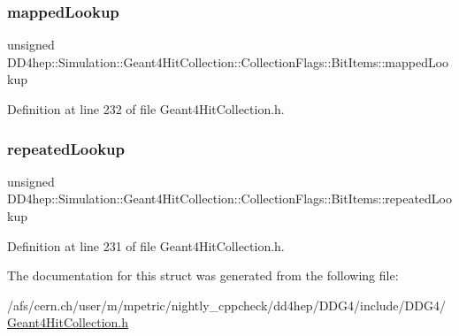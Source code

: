 \subsubsection{\texorpdfstring{mapped\+Lookup}{mappedLookup}}
{\footnotesize\ttfamily unsigned D\+D4hep\+::\+Simulation\+::\+Geant4\+Hit\+Collection\+::\+Collection\+Flags\+::\+Bit\+Items\+::mapped\+Lookup}



Definition at line 232 of file Geant4\+Hit\+Collection.\+h.

\hypertarget{struct_d_d4hep_1_1_simulation_1_1_geant4_hit_collection_1_1_collection_flags_1_1_bit_items_af334712a202c01ad71ea6578067ef3f7}{}\label{struct_d_d4hep_1_1_simulation_1_1_geant4_hit_collection_1_1_collection_flags_1_1_bit_items_af334712a202c01ad71ea6578067ef3f7} 
\subsubsection{\texorpdfstring{repeated\+Lookup}{repeatedLookup}}
{\footnotesize\ttfamily unsigned D\+D4hep\+::\+Simulation\+::\+Geant4\+Hit\+Collection\+::\+Collection\+Flags\+::\+Bit\+Items\+::repeated\+Lookup}



Definition at line 231 of file Geant4\+Hit\+Collection.\+h.



The documentation for this struct was generated from the following file\+:\begin{DoxyCompactItemize}
\item 
/afs/cern.\+ch/user/m/mpetric/nightly\+\_\+cppcheck/dd4hep/\+D\+D\+G4/include/\+D\+D\+G4/\hyperlink{_geant4_hit_collection_8h}{Geant4\+Hit\+Collection.\+h}\end{DoxyCompactItemize}

